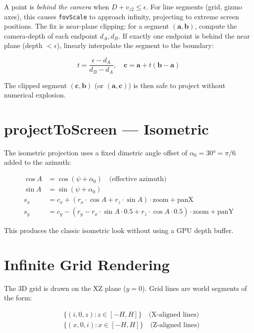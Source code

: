 \documentclass[12pt, a4paper]{report}
\theoremstyle{definition}
\theoremstyle{remark}
\begin{document}
A point is \emph{behind the camera} when $D + v_{z2} \leq \epsilon$.
For line segments (grid, gizmo axes), this causes \texttt{fovScale} to
approach infinity, projecting to extreme screen positions.
The fix is near-plane clipping: for a segment $(\mathbf{a}, \mathbf{b})$,
compute the camera-depth of each endpoint $d_A, d_B$. If exactly one
endpoint is behind the near plane (depth $< \epsilon$), linearly
interpolate the segment to the boundary:

\begin{equation}
t = \frac{\epsilon - d_A}{d_B - d_A}, \quad
\mathbf{c} = \mathbf{a} + t(\mathbf{b} - \mathbf{a})
\end{equation}

The clipped segment $(\mathbf{c}, \mathbf{b})$ (or $(\mathbf{a}, \mathbf{c})$)
is then safe to project without numerical explosion.

\section{projectToScreen — Isometric}

The isometric projection uses a fixed dimetric angle offset of
$\alpha_0 = 30° = \pi/6$ added to the azimuth:

\begin{align}
  \cos A &= \cos(\psi + \alpha_0) \quad\text{(effective azimuth)} \\
  \sin A &= \sin(\psi + \alpha_0) \\
  s_x &= c_x + (r_x \cdot \cos A + r_z \cdot \sin A) \cdot \text{zoom} + \text{panX} \\
  s_y &= c_y - (r_y - r_x \cdot \sin A \cdot 0.5 + r_z \cdot \cos A \cdot 0.5) \cdot \text{zoom} + \text{panY}
\end{align}

This produces the classic isometric look without using a GPU depth buffer.

\section{Infinite Grid Rendering}

The 3D grid is drawn on the XZ plane ($y = 0$). Grid lines are world
segments of the form:

\begin{align}
  &\{(i, 0, z) : z \in [-H, H]\} \quad \text{(X-aligned lines)} \\
  &\{(x, 0, i) : x \in [-H, H]\} \quad \text{(Z-aligned lines)}
\end{align}
\end{document}
